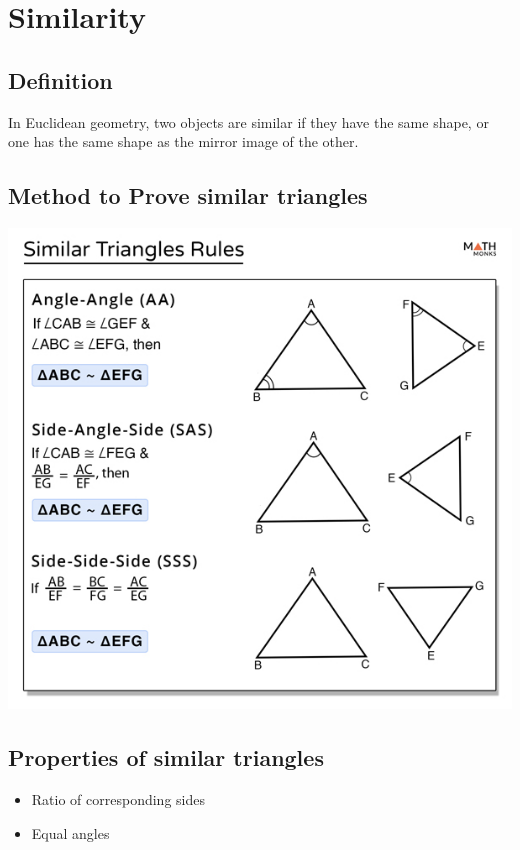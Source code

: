 \documentclass{article}
\begin{document}
\pagebreak
\section{Similarity}
\subsection{Definition}
In Euclidean geometry, two objects are similar if they have the same shape, or one has the same shape as the mirror image of the other.
\subsection{Method to Prove similar triangles}
\includegraphics[scale=.7]{Similar-Triangles-Rules.jpg}
\subsection{Properties of similar triangles}
\begin{itemize}
    \item Ratio of corresponding sides
    \item Equal angles
\end{itemize}
\pagebreak
\end{document}
